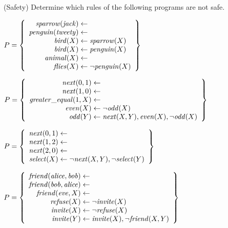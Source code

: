 \begin{Uebung}{(Safety)}%
Determine which rules of the following programs are not safe. 
\begin{UList}
\item
\(
P =
\left\{
\begin{array}{r@{{}\leftarrow{}}l}
    \mathit{sparrow}(\mathit{jack})        \\
    \mathit{penguin}(\mathit{tweety})      \\
    \mathit{bird}(X)  & \mathit{sparrow}(X) \\
    \mathit{bird}(X)  & \mathit{penguin}(X) \\
    \mathit{animal}(X)        \\
    \mathit{flies}(X) & \naf{\mathit{penguin}(X)}\\
\end{array}
\right\}
\)
\item 
\(
P =
\left\{
\begin{array}{r@{{}\leftarrow{}}l}
    \mathit{next}(0,1) \\
    \mathit{next}(1,0) \\
    \mathit{greater\_equal}(1,X) \\
    \mathit{even}(X) & \naf{\mathit{odd}(X)} \\
    \mathit{odd}(Y)  & \mathit{next}(X,Y), \mathit{even}(X), \naf{\mathit{odd}(X)}\\
\end{array}
\right\}
\)
\item
\(
P =
\left\{
\begin{array}{r@{{}\leftarrow{}}l}
    \mathit{next}(0,1) \\
    \mathit{next}(1,2) \\
    \mathit{next}(2,0) \\
    \mathit{select}(X)   & \naf{\mathit{next}(X,Y)}, \naf{\mathit{select}(Y)}
\end{array}
\right\}
\)
\item
\(
P =
\left\{
\begin{array}{r@{{}\leftarrow{}}l}
    \mathit{friend}(\mathit{alice},\mathit{bob})  \\
    \mathit{friend}(\mathit{bob},\mathit{alice})  \\
    \mathit{friend}(\mathit{eve},X)  \\
    \mathit{refuse}(X) & \naf{\mathit{invite}(X)} \\
    \mathit{invite}(X) & \naf{\mathit{refuse}(X)} \\
    \mathit{invite}(Y) & \mathit{invite}(X), \naf{\mathit{friend}(X,Y)}
\end{array}
\right\}
\)
\end{UList}
\end{Uebung}

